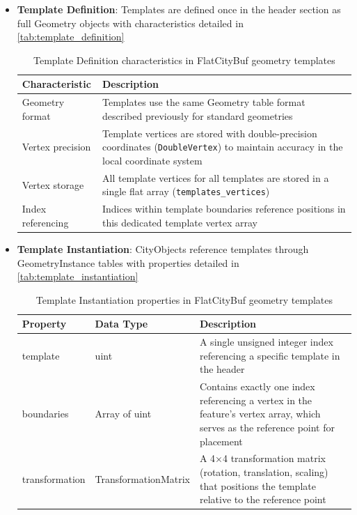 \begin{itemize}
  \item \textbf{Template Definition}: Templates are defined once in the header section as full Geometry objects with characteristics detailed in \autoref{tab:template_definition}

    \begin{table}[h]
      \centering
      \caption{Template Definition characteristics in FlatCityBuf geometry templates}
      \label{tab:template_definition}
      \small
      \begin{tabularx}{\textwidth}{@{}lX@{}}
        \toprule
        \textbf{Characteristic} & \textbf{Description} \\
        \midrule
        Geometry format & Templates use the same Geometry table format described previously for standard geometries \\
        Vertex precision & Template vertices are stored with double-precision coordinates (\texttt{DoubleVertex}) to maintain accuracy in the local coordinate system \\
        Vertex storage & All template vertices for all templates are stored in a single flat array (\texttt{templates\_vertices}) \\
        Index referencing & Indices within template boundaries reference positions in this dedicated template vertex array \\
        \bottomrule
      \end{tabularx}
    \end{table}

  \item \textbf{Template Instantiation}: CityObjects reference templates through GeometryInstance tables with properties detailed in \autoref{tab:template_instantiation}

    \begin{table}[h]
      \centering
      \caption{Template Instantiation properties in FlatCityBuf geometry templates}
      \label{tab:template_instantiation}
      \small
      \begin{tabularx}{\textwidth}{@{}llX@{}}
        \toprule
        \textbf{Property} & \textbf{Data Type} & \textbf{Description} \\
        \midrule
        template & uint & A single unsigned integer index referencing a specific template in the header \\
        boundaries & Array of uint & Contains exactly one index referencing a vertex in the feature's vertex array, which serves as the reference point for placement \\
        transformation & TransformationMatrix & A 4×4 transformation matrix (rotation, translation, scaling) that positions the template relative to the reference point \\
        \bottomrule
      \end{tabularx}
    \end{table}
\end{itemize}

